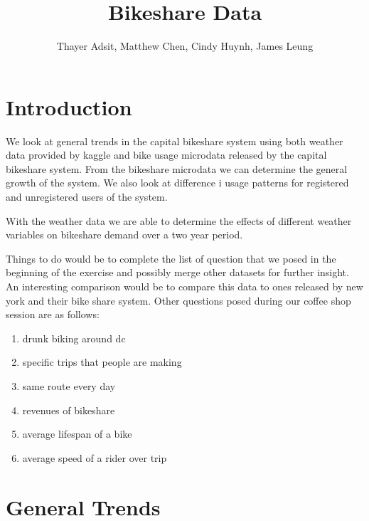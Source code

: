 \documentclass[12pt]{article}
\begin{document}
\title{Bikeshare Data}

\author{Thayer Adsit, Matthew Chen, Cindy Huynh, James Leung}

\maketitle

\section{Introduction}
We look at general trends in the capital bikeshare system using both weather data provided by kaggle and bike usage microdata released by the capital bikeshare system. From the bikeshare microdata we can determine the general growth of the system. We also look at difference i usage patterns for registered and unregistered users of the system.

With the weather data we are able to determine the effects of different weather variables on bikeshare demand over a two year period.

Things to do would be to complete the list of question that we posed in the beginning of the exercise and possibly merge other datasets for further insight. An interesting comparison would be to compare this data to ones released by new york and their bike share system. Other questions posed during our coffee shop session are as follows:

\begin{enumerate}
	\item drunk biking around dc
	\item specific trips that people are making
	\item same route every day
	\item revenues of bikeshare
	\item average lifespan of a bike
	\item average speed of a rider over trip
\end{enumerate}


\section{General Trends}
\end{document}
